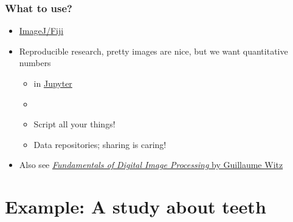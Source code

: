\begin{frame}
  \frametitle{What to use?}
  \begin{itemize}
    \item \href{http://fiji.sc/}{ImageJ/Fiji}~\cite{Schindelin2012}
    \item Reproducible research, \ie{} pretty images are nice, but we want quantitative numbers
      \begin{itemize}
        \item \href{https://www.python.org/}{\faPython} in \href{https://jupyter.org/}{Jupyter}~\cite{Kluyver2016}
        \item \href{https://git-scm.com/}{\faGit}
        \item Script all your things!
        \item Data repositories; \ie{} sharing is caring!
      \end{itemize}
    \item Also see \href{https://ilias.unibe.ch/goto_ilias3_unibe_sess_3022928.html}{\emph{Fundamentals of Digital Image Processing} by Guillaume Witz}      
  \end{itemize}
\end{frame}

\section{Example: A study about teeth}
